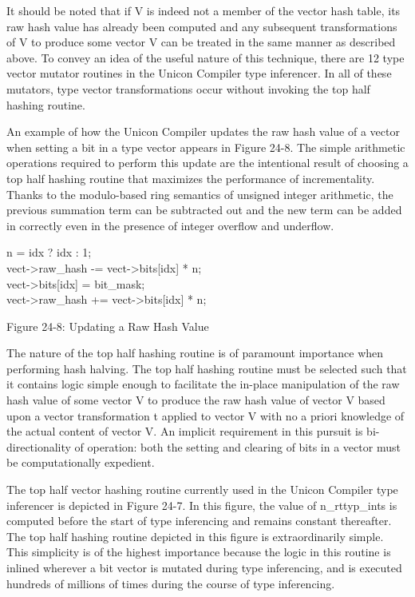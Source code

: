 {\bigskip

It should be noted that if V{} is indeed not a member
of the vector hash table, its raw hash value has already been computed
and any subsequent transformations of V{} to produce
some vector V{} can be treated in the same manner as
described above. To convey an idea of the useful nature of this
technique, there are 12 type vector mutator routines in the Unicon
Compiler type inferencer. In all of these mutators, type vector
transformations occur without invoking the top half hashing routine.

An example of how the Unicon Compiler updates the raw hash value of a
vector when setting a bit in a type vector appears in Figure 24-8. The
simple arithmetic operations required to perform this update are the
intentional result of choosing a top half hashing routine that
maximizes the performance of incrementality. Thanks to the
modulo-based ring semantics of unsigned integer arithmetic, the
previous summation term can be subtracted out and the new term can be
added in correctly even in the presence of integer overflow and
underflow.

\begin{iconcode}
n = idx ? idx : 1; \\
vect-{\textgreater}raw\_hash -= vect-{\textgreater}bits[idx] * n; \\
vect-{\textgreater}bits[idx] {\textbar}= bit\_mask; \\
vect-{\textgreater}raw\_hash += vect-{\textgreater}bits[idx] * n;
\end{iconcode}
{\centering
Figure 24-8: Updating a Raw Hash Value
\par}

\bigskip

The nature of the top half hashing routine is of paramount importance
when performing hash halving. The top half hashing routine must be
selected such that it contains logic simple enough to facilitate the
in-place manipulation of the raw hash value of some vector
V{} to produce the raw hash value of vector
V{} based upon a vector transformation t applied to
vector V{} with no a priori knowledge of the actual
content of vector V{}. An implicit requirement in
this pursuit is bi-directionality of operation: both the setting and
clearing of bits in a vector must be computationally expedient.

The top half vector hashing routine currently used in the Unicon
Compiler type inferencer is depicted in Figure 24-7. In this figure, the
value of {\textsf{n\_rttyp\_ints}} is computed before the start of
type inferencing and remains constant thereafter. The top half hashing
routine depicted in this figure is extraordinarily simple. This
simplicity is of the highest importance because the logic in this
routine is inlined wherever a bit vector is mutated during type
inferencing, and is executed hundreds of millions of times during the
course of type inferencing.

}
